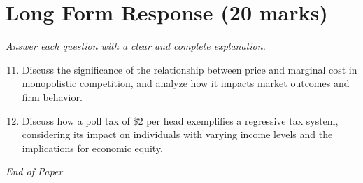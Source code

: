 \documentclass[12pt]{article}
\begin{document}
\section*{Long Form Response (20 marks)}
\textit{Answer each question with a clear and complete explanation.}
\begin{enumerate}[label=\arabic*.]
\setcounter{enumi}{10}
\item Discuss the significance of the relationship between price and marginal cost in monopolistic competition, and analyze how it impacts market outcomes and firm behavior.
\item Discuss how a poll tax of \$2 per head exemplifies a regressive tax system, considering its impact on individuals with varying income levels and the implications for economic equity.
\end{enumerate}

\vfill
\noindent\textit{End of Paper}
\end{document}
